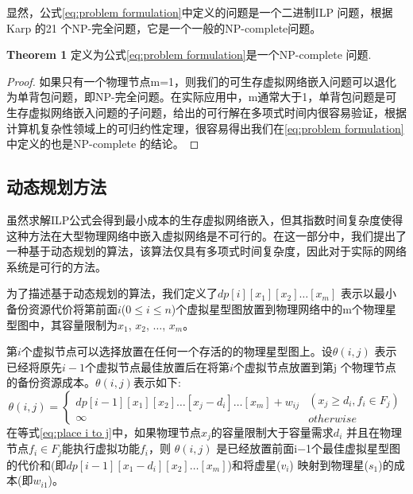 显然，公式\ref{eq:problem formulation}中定义的问题是一个二进制ILP 问题，根据Karp 的21 个NP-完全问题\cite{karp1975computational}，它是一个一般的NP-complete问题。

\textbf{Theorem 1} 定义为公式\ref{eq:problem formulation}是一个NP-complete 问题.
\begin{proof}
如果只有一个物理节点m=1，则我们的可生存虚拟网络嵌入问题可以退化为单背包问题，即NP-完全问题。在实际应用中，m通常大于1，单背包问题是可生存虚拟网络嵌入问题的子问题，给出的可行解在多项式时间内很容易验证，根据计算机复杂性领域上的可归约性定理\cite{wood1987theory}，很容易得出我们在\ref{eq:problem formulation}中定义的也是NP-complete 的结论。
\end{proof}

\subsection{动态规划方法}
\label{lab:DynamicProgrammingEquation}
虽然求解ILP公式会得到最小成本的生存虚拟网络嵌入，但其指数时间复杂度使得这种方法在大型物理网络中嵌入虚拟网络是不可行的。在这一部分中，我们提出了一种基于动态规划的算法，该算法仅具有多项式时间复杂度，因此对于实际的网络系统是可行的方法。

为了描述基于动态规划的算法，我们定义了$dp[i][{x_1}][{x_2}] \ldots [{x_m}]$ 表示以最小备份资源代价将第前面$i$($0 \le i \le n $)个虚拟星型图放置到物理网络中的m个物理星型图中，其容量限制为$ x_1$, $ x_2$, $\ldots$, $x_m$。

第$i$个虚拟节点可以选择放置在任何一个存活的的物理星型图上。设$\theta (i,j)$ 表示已经将原先$i-1$个虚拟节点最佳放置后在将第$i$个虚拟节点放置到第j 个物理节点的备份资源成本。$\theta (i,j)$表示如下:
\begin{equation}
\theta (i,j) = \left\{ {\begin{array}{*{20}{c}}
{dp[i - 1][x_1][{x_2}] \ldots [{x_j} - {d_i}] \ldots [{x_m}] + {w_{ij}}}\\
\infty
\end{array}} \right.\begin{array}{*{20}{c}}
{({x_j} \ge {d_i},{f_i} \in {F_j})}\\
{otherwise}
\end{array}
\label{eq:place i to j}
\end{equation}
在等式\ref{eq:place i to j}中，如果物理节点$x_j$的容量限制大于容量需求$d_i$ 并且在物理节点${f_i} \in {F_j}$能执行虚拟功能$f_i$，则 $\theta (i,j)$ 是已经放置前面i−1个最佳虚拟星型图的代价和(即$dp[i-1][{x_1} - {d_i}][{x_2}] \ldots [{x_m}]$)和将虚星($v_i$) 映射到物理星($s_1$)的成本(即$w_{i1}$)。

